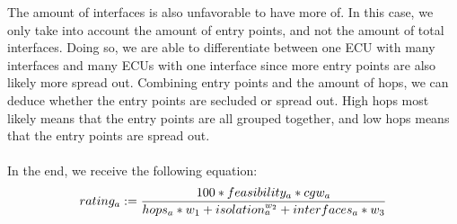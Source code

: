 The amount of interfaces is also unfavorable to have more of.
In this case, we only take into account the amount of entry points, and not the amount of total interfaces.
Doing so, we are able to differentiate between one ECU with many interfaces and many ECUs with one interface since more entry points are also likely more spread out.
Combining entry points and the amount of hops, we can deduce whether the entry points are secluded or spread out.
High hops most likely means that the entry points are all grouped together, and low hops means that the entry points are spread out.\\\\

In the end, we receive the following equation:\\
\begin{equation}
    rating_{a} := \frac{100 * feasibility_{a} * cgw_{a}}{hops_{a}*w_{1} + isolation_{a}^{w_{2}} + interfaces_{a}*w_{3}} \label{eq:rating}\\\\
\end{equation}

\hfill \break